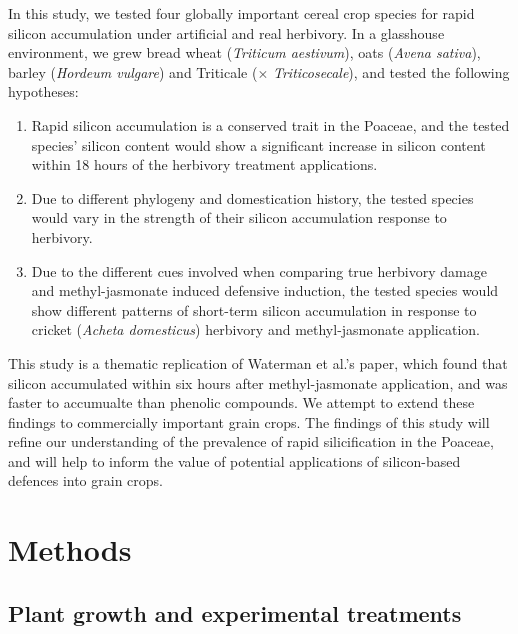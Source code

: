 \documentclass[12pt, letterpaper, ]{report}
\begin{document}
In this study, we tested four globally important cereal crop species for rapid silicon accumulation under artificial and real herbivory. In a glasshouse environment, we grew bread wheat (\textit{Triticum aestivum}), oats (\textit{Avena sativa}), barley (\textit{Hordeum vulgare}) and Triticale ($\times$ \textit{Triticosecale}), and tested the following hypotheses:
\begin{enumerate}
        \item Rapid silicon accumulation is a conserved trait in the Poaceae, and the tested species' silicon content would show a significant increase in silicon content within 18 hours of the herbivory treatment applications.
        \item Due to different phylogeny and domestication history, the tested species would vary in the strength of their silicon accumulation response to herbivory. 
        \item Due to the different cues involved when comparing true herbivory damage and methyl-jasmonate induced defensive induction, the tested species would show different patterns of short-term silicon accumulation in response to cricket (\textit{Acheta domesticus}) herbivory and methyl-jasmonate application. 
\end{enumerate}
This study is a thematic replication of Waterman et al.’s  paper, which found that silicon accumulated within six hours after methyl-jasmonate application, and was faster to accumualte than phenolic compounds. We attempt to extend these findings to commercially important grain crops. The findings of this study will refine our understanding of the prevalence of rapid silicification in the Poaceae, and will help to inform the value of potential applications of silicon-based defences into grain crops.

\section{Methods}

\subsection{Plant growth and experimental treatments}
\end{document}

